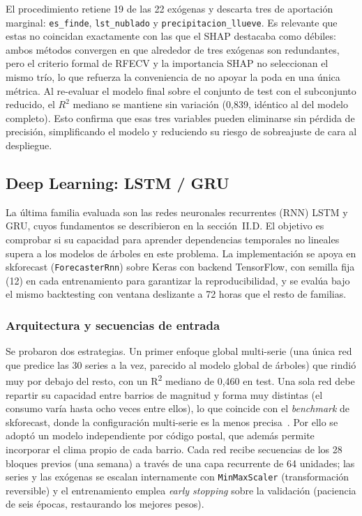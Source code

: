 \documentclass[12pt, a4paper]{article}
\begin{document}
El procedimiento retiene 19 de las 22 exógenas y descarta tres de aportación marginal: \texttt{es\_finde}, \texttt{lst\_nublado} y \texttt{precipitacion\_llueve}. Es relevante que estas no coincidan exactamente con las que el SHAP destacaba como débiles: ambos métodos convergen en que alrededor de tres exógenas son redundantes, pero el criterio formal de RFECV y la importancia SHAP no seleccionan el mismo trío, lo que refuerza la
conveniencia de no apoyar la poda en una única métrica. Al re-evaluar el modelo final sobre el conjunto de test con el subconjunto reducido, el $R^2$ mediano se mantiene sin variación (0,839, idéntico al del modelo completo). Esto confirma que esas tres variables pueden eliminarse sin pérdida de precisión, simplificando el modelo y
reduciendo su riesgo de sobreajuste de cara al despliegue.

\subsection{Deep Learning: LSTM / GRU}

La última familia evaluada son las redes neuronales recurrentes (RNN) LSTM y GRU, cuyos fundamentos se describieron en la sección~II.D. El objetivo es comprobar si su capacidad para aprender dependencias temporales no lineales supera a los modelos de árboles en este problema. La implementación se apoya en skforecast (\texttt{ForecasterRnn}) sobre Keras con backend TensorFlow, con semilla fija (12) en cada entrenamiento para garantizar la reproducibilidad, y se evalúa bajo el mismo backtesting con ventana deslizante a 72 horas que el resto de familias.

\subsubsection{Arquitectura y secuencias de entrada}

Se probaron dos estrategias. Un primer enfoque global multi-serie (una única red que predice las 30 series a la vez, parecido  al modelo global de árboles) que rindió muy por debajo del resto, con un R\textsuperscript{2} mediano de 0,460 en test. Una sola red debe repartir su capacidad entre barrios de magnitud y forma muy distintas (el consumo varía hasta ocho veces entre ellos), lo que coincide con el \textit{benchmark} de skforecast, donde la configuración multi-serie es la menos precisa~\cite{skforecast}. Por ello se adoptó un modelo independiente por código postal, que además permite incorporar el clima propio de cada barrio. Cada red recibe secuencias de los 28 bloques previos (una semana) a través de una capa recurrente de 64 unidades; las series y las exógenas se escalan internamente con \texttt{MinMaxScaler} (transformación reversible) y el entrenamiento emplea \textit{early stopping} sobre la validación (paciencia de seis épocas, restaurando los mejores pesos).
\end{document}
